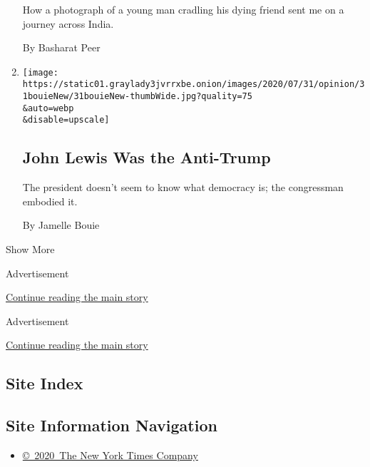 \begin{enumerate}
  How a photograph of a young man cradling his dying friend sent me on a
  journey across India.

  By Basharat Peer
\item
  \href{/2020/07/31/opinion/sunday/john-lewis-trump-election-2020.html}{}

  \texttt{[image: https://static01.graylady3jvrrxbe.onion/images/2020/07/31/opinion/31bouieNew/31bouieNew-thumbWide.jpg?quality=75\\\&auto=webp\\\&disable=upscale]}

  \hypertarget{john-lewis-was-the-anti-trump}{%
  \subsection{John Lewis Was the
  Anti-Trump}\label{john-lewis-was-the-anti-trump}}

  The president doesn't seem to know what democracy is; the congressman
  embodied it.

  By Jamelle Bouie
\end{enumerate}

Show More

Advertisement

\protect\hyperlink{after-mid1}{Continue reading the main story}

Advertisement

\protect\hyperlink{after-mktg}{Continue reading the main story}

\hypertarget{site-index}{%
\subsection{Site Index}\label{site-index}}

\hypertarget{site-information-navigation}{%
\subsection{Site Information
Navigation}\label{site-information-navigation}}

\begin{itemize}
\tightlist
\item
  \href{https://help.nytimes3xbfgragh.onion/hc/en-us/articles/115014792127-Copyright-notice}{©~2020~The
  New York Times Company}
\end{itemize}

